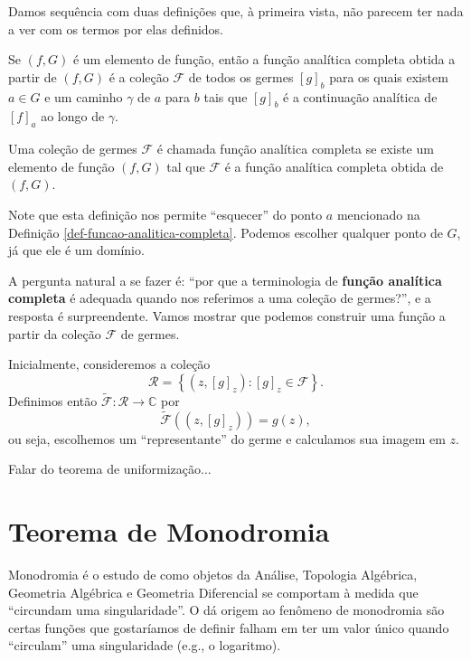 Damos sequência com duas definições que, à primeira vista, não parecem ter 
nada a ver com os termos por elas definidos.

\begin{definicao}
\label{def-funcao-analitica-completa}
Se $(f,G)$ é um elemento de função, então a função analítica completa obtida
a partir de $(f,G)$ é a coleção $\mathcal{F}$ de todos os germes $[g]_b$ 
para os quais existem $a\in G$ e um caminho $\gamma$ de $a$ para $b$ 
tais que $[g]_b$ é a continuação analítica de $[f]_a$ ao longo de $\gamma$.
\end{definicao}


\begin{definicao}
Uma coleção de germes $\mathcal{F}$ é chamada função analítica completa se
existe um elemento de função $(f,G)$ tal que $\mathcal{F}$ é a função analítica
completa obtida de $(f,G)$.
\end{definicao}

Note que esta definição nos permite ``esquecer'' do ponto $a$ mencionado na
Definição \ref{def-funcao-analitica-completa}. Podemos escolher qualquer ponto
de $G$, já que ele é um domínio.

A pergunta natural a se fazer é: ``por que a terminologia de 
\textbf{função analítica completa} é adequada quando nos referimos a uma
coleção de germes?'', e a resposta é surpreendente. Vamos mostrar que
podemos construir uma função a partir da coleção $\mathcal{F}$ de germes.

Inicialmente, consideremos a coleção
\begin{equation*}
    \mathcal{R} = \left\{ (z, [g]_z) : [g]_z \in \mathcal{F} \right\}.
\end{equation*}
Definimos então $\widetilde{\mathcal{F}}:\mathcal{R}\to\mathbb{C}$ por
\begin{equation*}
    \widetilde{\mathcal{F}}((z, [g]_z)) = g(z),
\end{equation*}
ou seja, escolhemos um ``representante'' do germe e calculamos sua imagem em $z$.

{\red Falar do teorema de uniformização...}

\section{Teorema de Monodromia}

Monodromia é o estudo de como objetos da Análise, Topologia Algébrica, Geometria
Algébrica e Geometria Diferencial se comportam à medida que 
``circundam uma singularidade''. O dá origem ao fenômeno de monodromia são certas
funções que gostaríamos de definir falham em ter um valor único quando ``circulam''
uma singularidade (e.g., o logaritmo).

